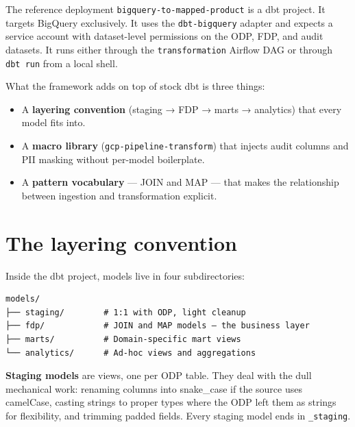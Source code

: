 \documentclass[
  11pt,
  british,
  oneside]{book}
\providecommand{\tightlist}{%
  \setlength{\itemsep}{0pt}\setlength{\parskip}{0pt}}
\begin{document}
The reference deployment \texttt{bigquery-to-mapped-product} is a dbt
project. It targets BigQuery exclusively. It uses the
\texttt{dbt-bigquery} adapter and expects a service account with
dataset-level permissions on the ODP, FDP, and audit datasets. It runs
either through the \texttt{transformation} Airflow DAG or through
\texttt{dbt\ run} from a local shell.

What the framework adds on top of stock dbt is three things:

\begin{itemize}
\tightlist
\item
  A \textbf{layering convention} (staging → FDP → marts → analytics)
  that every model fits into.
\item
  A \textbf{macro library}
  (\texttt{gcp-pipeline-transform}) that
  injects audit columns and PII masking without per-model boilerplate.
\item
  A \textbf{pattern vocabulary} --- JOIN and MAP --- that makes the
  relationship between ingestion and transformation explicit.
\end{itemize}

\hypertarget{the-layering-convention}{%
\section{The layering convention}\label{the-layering-convention}}

Inside the dbt project, models live in four subdirectories:

\begin{verbatim}
models/
├── staging/        # 1:1 with ODP, light cleanup
├── fdp/            # JOIN and MAP models — the business layer
├── marts/          # Domain-specific mart views
└── analytics/      # Ad-hoc views and aggregations
\end{verbatim}

\textbf{Staging models} are views, one per ODP table. They deal with the
dull mechanical work: renaming columns into snake\_case if the source
uses camelCase, casting strings to proper types where the ODP left them
as strings for flexibility, and trimming padded fields. Every staging
model ends in \texttt{\_staging}.
\end{document}

